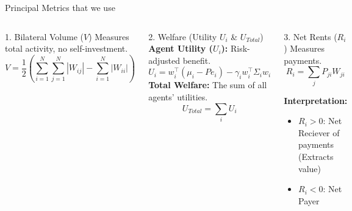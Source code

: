 \documentclass[aspectratio=169]{beamer}
\begin{document}
\begin{frame}{Principal Metrics that we use}

    \vspace{-0.5cm}
    \begin{columns}[T]
        \begin{block}{1. Bilateral Volume ($V$) }
            Measures total activity, no self-investment.
            $$V = \frac{1}{2} \left( \sum_{i=1}^N \sum_{j=1}^N |W_{ij}| - \sum_{i=1}^N |W_{ii}| \right)$$
        \end{block}
        
        \begin{block}{2. Welfare (Utility $U_i$ \& $U_{Total}$)}
            \textbf{Agent Utility ($U_i$):} Risk-adjusted benefit.
            $$U_i = w_i^\top (\mu_i - P e_i) - \gamma_i w_i^\top \Sigma_i w_i$$
            \textbf{Total Welfare:} The sum of all agents' utilities.
            $$U_{Total} = \sum_{i} U_i$$
        \end{block}
        
        \begin{block}{3. Net Rents ($R_i$)}
            Measures payments.
            $$R_i = \sum_{j} P_{ji} W_{ji}$$
            
            \textbf{Interpretation:}
            \begin{itemize}
                \item \textcolor{SafeGreen}{$R_i > 0$}: Net Reciever of payments (Extracts value)
                \item \textcolor{AlertRed}{$R_i < 0$}: Net Payer 
            \end{itemize}
        \end{block}
        
    \end{columns}
\end{frame}
\end{document}
